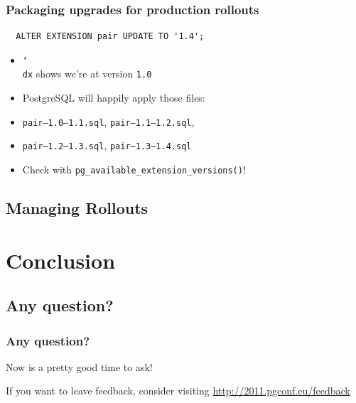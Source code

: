 \documentclass[english]{beamer}
\begin{document}
\begin{frame}[fragile]
  \frametitle{Packaging upgrades for production rollouts}

\begin{example}[update to 1.4]
\begin{verbatim}
  ALTER EXTENSION pair UPDATE TO '1.4';
\end{verbatim}
\end{example}

  \begin{itemize}
   \item<1-> \texttt{\char`\\dx} shows we're at version \texttt{1.0}
   \item<1-> PostgreSQL will happily apply those files:
   \item<2-> \texttt{pair---1.0---1.1.sql}, \texttt{pair---1.1---1.2.sql},
   \item<2-> \texttt{pair---1.2---1.3.sql}, \texttt{pair---1.3---1.4.sql}
   \item<3-> \alert{Check} with \texttt{pg\_available\_extension\_versions()}!
  \end{itemize}
\end{frame}

\subsection{Managing Rollouts}


\section{Conclusion}

\subsection{Any question?}

\begin{frame}[fragile]
  \frametitle{Any question?}

  \begin{center}
    Now is a pretty good time to ask!
  \end{center}

  \linebreak
  \begin{center}
    If you want to leave feedback, consider visiting
    \url{http://2011.pgconf.eu/feedback}
  \end{center}
\end{frame}
\end{document}
